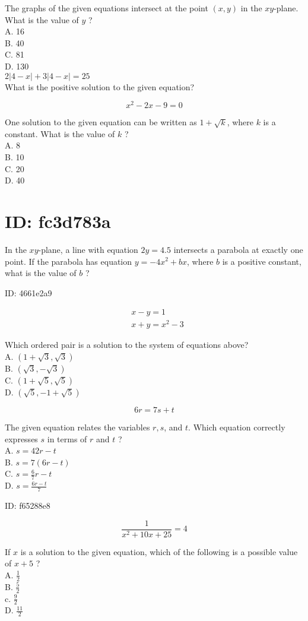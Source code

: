 The graphs of the given equations intersect at the point $(x, y)$ in the $x y$-plane. What is the value of $y$ ?\\
A. 16\\
B. 40\\
C. 81\\
D. 130\\
$2|4-x|+3|4-x|=25$\\
What is the positive solution to the given equation?

$$
x^{2}-2 x-9=0
$$

One solution to the given equation can be written as $1+\sqrt{k}$, where $k$ is a constant. What is the value of $k$ ?\\
A. 8\\
B. 10\\
C. 20\\
D. 40

\section*{ID: fc3d783a}
In the $x y$-plane, a line with equation $2 y=4.5$ intersects a parabola at exactly one point. If the parabola has equation $y=-4 x^{2}+b x$, where $b$ is a positive constant, what is the value of $b$ ?

ID: 4661e2a9

$$
\begin{aligned}
& x-y=1 \\
& x+y=x^{2}-3
\end{aligned}
$$

Which ordered pair is a solution to the system of equations above?\\
A. $(1+\sqrt{3}, \sqrt{3})$\\
B. $(\sqrt{3},-\sqrt{3})$\\
C. $(1+\sqrt{5}, \sqrt{5})$\\
D. $(\sqrt{5},-1+\sqrt{5})$

$$
6 r=7 s+t
$$

The given equation relates the variables $r, s$, and $t$. Which equation correctly expresses $s$ in terms of $r$ and $t$ ?\\
A. $s=42 r-t$\\
B. $s=7(6 r-t)$\\
C. $s=\frac{6}{7} r-t$\\
D. $s=\frac{6 r-t}{7}$

ID: f65288e8

$$
\frac{1}{x^{2}+10 x+25}=4
$$

If $x$ is a solution to the given equation, which of the following is a possible value of $x+5$ ?\\
A. $\frac{1}{2}$\\
B. $\frac{5}{2}$\\
c. $\frac{9}{2}$\\
D. $\frac{11}{2}$

